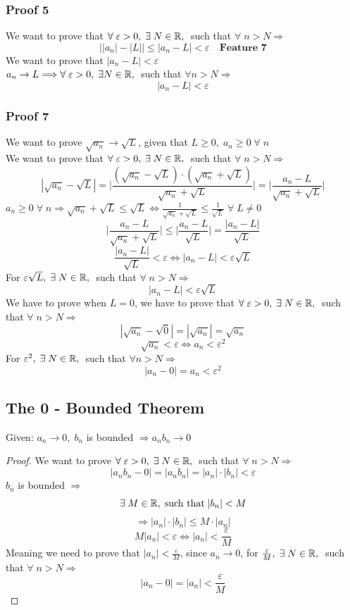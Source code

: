 \subsubsection{Proof 5}
We want to prove that $\forall\; \varepsilon>0,\;\exists\; N\in \mathbb{R},\;$ such that $\forall\; n>N\Longrightarrow$
\[
    \Big| |a_n| - |L| \Big| \leq \Big| a_n-L \Big|<\varepsilon \quad \textbf{Feature 7}
\]
We want to prove that $|a_n-L|<\varepsilon$\\
$a_n\rightarrow L \Longrightarrow \forall\; \varepsilon>0,\; \exists N\in \mathbb{R},\;$ such that $\forall n>N\Longrightarrow$
\[
    |a_n-L|<\varepsilon
\]

\subsubsection{Proof 7}
We want to prove $\sqrt{a_n}\rightarrow \sqrt{L}$, given that $L\geq 0,\; a_n\geq 0\; \forall\; n$\\
We want to prove that $\forall\; \varepsilon>0,\; \exists\; N\in \mathbb{R},\;$ such that $\forall\; n>N\Longrightarrow$
\[
    |\sqrt{a_n}-\sqrt{L}|=\Big|\frac{(\sqrt{a_n}-\sqrt{L})\cdot (\sqrt{a_n}+\sqrt{L})}{\sqrt{a_n}+\sqrt{L}} \Big| = \Big|\frac{a_n-L}{\sqrt{a_n}+\sqrt{L}}\Big|
\] 
$a_n\geq 0 \; \forall\; n \Longrightarrow \sqrt{a_n}+\sqrt{L}\leq\sqrt{L}\iff \frac{1}{\sqrt{a_n}+\sqrt{L}}\leq\frac{1}{\sqrt{L}}\; \forall\; L\neq 0$
\[
    \Big|\frac{a_n-L}{\sqrt{a_n}+\sqrt{L}}\Big|\leq\Big|\frac{a_n-L}{\sqrt{L}}\Big| = \frac{|a_n-L|}{\sqrt{L}}
\]
\[
    \frac{|a_n-L|}{\sqrt{L}}<\varepsilon \iff |a_n-L|<\varepsilon\sqrt{L}
\]
For $\varepsilon\sqrt{L},\; \exists\; N\in \mathbb{R},\;$ such that $\forall\; n>N\Longrightarrow$
\[
    |a_n-L|<\varepsilon\sqrt{L}
\]
We have to prove when $L=0$, we have to prove that $\forall\; \varepsilon>0,\; \exists\; N\in\mathbb{R},\;$ such that $\forall\; n>N\Longrightarrow$
\[
    |\sqrt{a_n}-\sqrt{0}| = |\sqrt{a_n}| = \sqrt{a_n}
\]
\[
    \sqrt{a_n}<\varepsilon \iff a_n<\varepsilon^2
\]
For $\varepsilon^2,\; \exists\; N\in\mathbb{R},\;$ such that $\forall n>N\Longrightarrow$
\[
    |a_n-0|=a_n<\varepsilon^2
\]

\newpage

\subsection{The 0 - Bounded Theorem}
Given: $a_n\rightarrow 0,\; b_n$ is bounded $\Longrightarrow a_nb_n\rightarrow 0$
\begin{proof}
    We want to prove $\forall\; \varepsilon>0,\; \exists\; N\in \mathbb{R},\;$ such that $\forall\; n>N\Longrightarrow$
    \[
        |a_nb_n-0|=|a_nb_n| = |a_n|\cdot|b_n|<\varepsilon
    \]
    $b_n$ is bounded $\Longrightarrow$
    \[
        \exists\; M\in \mathbb{R},\; \text{such that}\; |b_n|<M
    \]
    \[
        \Longrightarrow |a_n|\cdot |b_n|\leq M\cdot|a_n|
    \]
    \[
        M|a_n|<\varepsilon \iff |a_n|<\frac{\varepsilon}{M}
    \]
    Meaning we need to prove that $|a_n|<\frac{\varepsilon}{M}$, since $a_n\rightarrow 0$, for $\frac{\varepsilon}{M},\; \exists\; N\in \mathbb{R},\;$ such that $\forall\; n>N\Longrightarrow$
    \[
        |a_n-0| = |a_n|<\frac{\varepsilon}{M}
    \] 
\end{proof}

